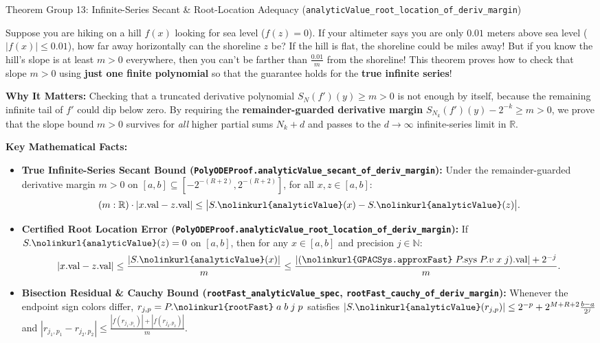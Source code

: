 \documentclass[11pt,a4paper]{article}
\newcommand{\N}{\ensuremath{\mathbb{N}}}
\newcommand{\R}{\ensuremath{\mathbb{R}}}
\newcommand{\lean}[1]{\texttt{\nolinkurl{#1}}}
\begin{document}
\vspace{6pt}

\begin{thmcard}{Theorem Group 13: Infinite-Series Secant \& Root-Location Adequacy (\lean{analyticValue\_root\_location\_of\_deriv\_margin})}
\begin{eli5box}
Suppose you are hiking on a hill $f(x)$ looking for sea level ($f(z) = 0$). If your altimeter says you are only $0.01$ meters above sea level ($|f(x)| \le 0.01$), how far away horizontally can the shoreline $z$ be? If the hill is flat, the shoreline could be miles away! But if you know the hill's slope is at least $m > 0$ everywhere, then you can't be farther than $\frac{0.01}{m}$ from the shoreline! This theorem proves how to check that slope $m > 0$ using \textbf{just one finite polynomial} so that the guarantee holds for the \textbf{true infinite series}!
\end{eli5box}

\textbf{Why It Matters:}
Checking that a truncated derivative polynomial $S_N(f')(y) \ge m > 0$ is not enough by itself, because the remaining infinite tail of $f'$ could dip below zero. By requiring the \textbf{remainder-guarded derivative margin} $S_{N_k}(f')(y) - 2^{-k} \ge m > 0$, we prove that the slope bound $m > 0$ survives for \emph{all} higher partial sums $N_k + d$ and passes to the $d \to \infty$ infinite-series limit in $\R$.

\textbf{Key Mathematical Facts:}
\begin{itemize}
  \item \textbf{True Infinite-Series Secant Bound (\lean{PolyODEProof.analyticValue_secant_of_deriv_margin}):} Under the remainder-guarded derivative margin $m > 0$ on $[a,b] \subseteq [-2^{-(R+2)}, 2^{-(R+2)}]$, for all $x, z \in [a,b]$:
  \[
    (m : \R) \cdot |x.\mathrm{val} - z.\mathrm{val}| \le \bigl|S.\lean{analyticValue}(x) - S.\lean{analyticValue}(z)\bigr|.
  \]
  \item \textbf{Certified Root Location Error (\lean{PolyODEProof.analyticValue_root_location_of_deriv_margin}):} If $S.\lean{analyticValue}(z) = 0$ on $[a,b]$, then for any $x \in [a,b]$ and precision $j \in \N$:
  \[
    |x.\mathrm{val} - z.\mathrm{val}| \le \frac{|S.\lean{analyticValue}(x)|}{m} \le \frac{|(\lean{GPACSys.approxFast}\;P.\mathrm{sys}\;P.v\;x\;j).\mathrm{val}| + 2^{-j}}{m}.
  \]
  \item \textbf{Bisection Residual \& Cauchy Bound (\lean{rootFast_analyticValue_spec}, \lean{rootFast_cauchy_of_deriv_margin}):} Whenever the endpoint sign colors differ, $r_{j,p} = P.\lean{rootFast}\;a\;b\;j\;p$ satisfies $|S.\lean{analyticValue}(r_{j,p})| \le 2^{-p} + 2^{M+R+2}\frac{b-a}{2^j}$ and $|r_{j_1,p_1} - r_{j_2,p_2}| \le \frac{|f(r_{j_1,p_1})| + |f(r_{j_2,p_2})|}{m}$.
\end{itemize}


\end{thmcard}
\end{document}
